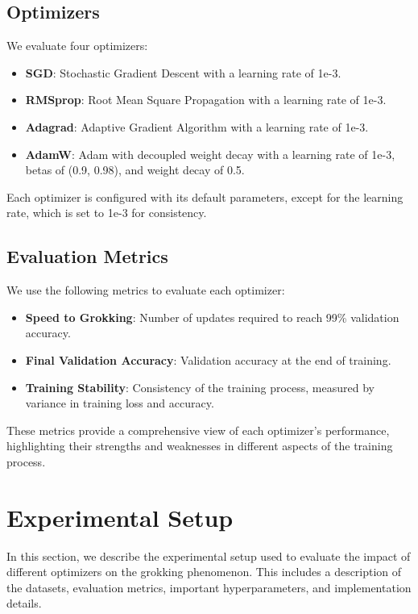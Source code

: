 \documentclass{article} %
\begin{document}
\subsection{Optimizers}
We evaluate four optimizers:
\begin{itemize}
    \item \textbf{SGD}: Stochastic Gradient Descent \cite{goodfellow2016deep} with a learning rate of 1e-3.
    \item \textbf{RMSprop}: Root Mean Square Propagation with a learning rate of 1e-3.
    \item \textbf{Adagrad}: Adaptive Gradient Algorithm with a learning rate of 1e-3.
    \item \textbf{AdamW}: Adam with decoupled weight decay \cite{loshchilov2017adamw} with a learning rate of 1e-3, betas of (0.9, 0.98), and weight decay of 0.5.
\end{itemize}
Each optimizer is configured with its default parameters, except for the learning rate, which is set to 1e-3 for consistency.

\subsection{Evaluation Metrics}
We use the following metrics to evaluate each optimizer:
\begin{itemize}
    \item \textbf{Speed to Grokking}: Number of updates required to reach 99\% validation accuracy.
    \item \textbf{Final Validation Accuracy}: Validation accuracy at the end of training.
    \item \textbf{Training Stability}: Consistency of the training process, measured by variance in training loss and accuracy.
\end{itemize}
These metrics provide a comprehensive view of each optimizer's performance, highlighting their strengths and weaknesses in different aspects of the training process.

\section{Experimental Setup}
\label{sec:experimental}

In this section, we describe the experimental setup used to evaluate the impact of different optimizers on the grokking phenomenon. This includes a description of the datasets, evaluation metrics, important hyperparameters, and implementation details.
\end{document}
